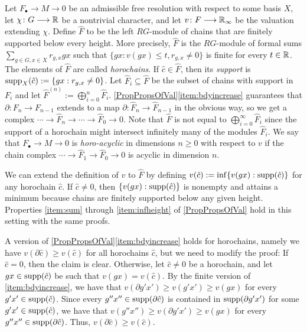 \documentclass[11pt, letterpaper]{amsart}
\begin{document}
\begin{defn}
Let $F_\bullet \longrightarrow M \longrightarrow 0$ be an admissible free resolution with respect to some basis $X$, let $\chi \colon G \longrightarrow \mathbb{R}$ be a nontrivial character, and let $v \colon F \longrightarrow \mathbb{R}_\infty$ be the valuation extending $\chi$. Define $\widehat{F}$ to be the left $RG$-module of chains that are finitely supported below every height. More precisely, $\widehat{F}$ is the $RG$-module of formal sums $\sum_{g \in G, x \in X} r_{g,x} g x$ such that $\{ gx : v(gx) \leqslant t, r_{g,x} \neq 0 \}$ is finite for every $t \in \mathbb{R}$. The elements of $\widehat{F}$ are called \textit{horochains}. If $\hat{c} \in \widehat{F}$, then its \textit{support} is $\operatorname{supp}_X(\hat{c}) := \{ gx : r_{g,x} \neq 0 \}$. Let $\widehat{F}_i \subseteq \widehat{F}$ be the subset of chains with support in $F_i$ and let $\widehat{F}^{(n)} := \bigoplus_{i = 0}^n \widehat{F}_i$. \cref{PropPropsOfVal}\ref{item:bdyincrease} guarantees that $\partial \colon F_n \longrightarrow F_{n-1}$ extends to a map $\partial \colon \widehat{F}_n \longrightarrow \widehat{F}_{n-1}$ in the obvious way, so we get a complex $\cdots \longrightarrow \widehat{F}_n \longrightarrow \cdots \longrightarrow \widehat{F}_0 \longrightarrow 0$. Note that $\widehat{F}$ is not equal to $\bigoplus_{i = 0}^\infty \widehat{F}_i$ since the support of a horochain might intersect infinitely many of the modules $\widehat{F}_i$. We say that $F_\bullet \longrightarrow M \longrightarrow 0$ is \textit{horo-acyclic} in dimensions $n \geqslant 0$ with respect to $v$ if the chain complex $\cdots \longrightarrow \widehat{F}_1 \longrightarrow \widehat{F}_0 \longrightarrow 0$ is acyclic in dimension $n$.
\end{defn}

We can extend the definition of $v$ to $\widehat{F}$ by defining $v(\hat{c}) := \inf\{ v(gx) : \operatorname{supp}(\hat{c})\}$ for any horochain $\hat{c}$. If $\hat{c} \neq 0$, then $\{ v(gx) : \operatorname{supp}(\hat{c})\}$ is nonempty and attains a minimum because chains are finitely supported below any given height.  Properties \ref{item:sum} through \ref{item:infheight} of \cref{PropPropsOfVal} hold in this setting with the same proofs. 

A version of \cref{PropPropsOfVal}\ref{item:bdyincrease} holds for horochains, namely we have $v(\partial \hat{c}) \geqslant v(\hat{c})$ for all horochains $\hat{c}$, but we need to modify the proof: If $\hat{c} = 0$, then the claim is clear. Otherwise, let $\hat{c} \neq 0$ be a horochain, and let $gx \in \operatorname{supp}(\hat{c})$ be such that $v(gx) = v(\hat{c})$. By the finite version of \ref{item:bdyincrease}, we have that $v(\partial g'x') \geqslant v(g'x') \geqslant v(gx)$ for every $g'x' \in \operatorname{supp}(\hat{c})$. Since every $g''x'' \in \operatorname{supp}(\partial \hat{c})$ is contained in $\operatorname{supp}(\partial g'x')$ for some $g'x' \in \operatorname{supp}(\hat{c})$, we have that $v(g''x'') \geqslant v(\partial g'x') \geqslant v(gx)$ for every $g''x'' \in \operatorname{supp}(\partial \hat{c})$. Thus, $v(\partial \hat{c}) \geqslant v(\hat{c})$. 
\end{document}
